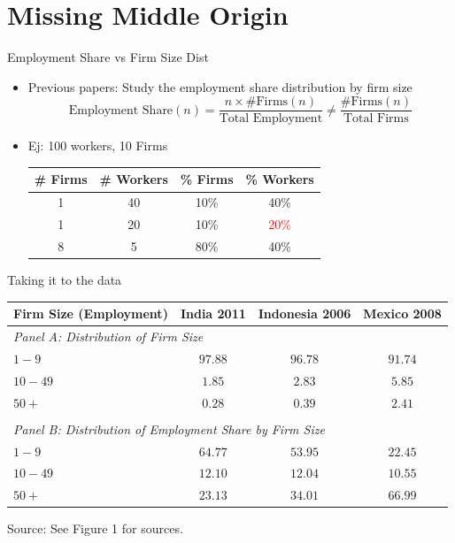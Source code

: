 \documentclass[usenames,dvipsnames,aspectratio=169]{beamer}
\begin{document}
\section{Missing Middle Origin}

\begin{frame}{Employment Share vs Firm Size Dist}
\begin{itemize}[label=\textcolor{violet}{$\blacktriangleright$}]
    \item Previous papers: Study the employment share distribution by firm size
    \begin{equation*}
        \text{Employment Share}(n) = \dfrac{n\times\#\text{Firms}(n)}{\text{Total Employment}}\neq  \dfrac{\#\text{Firms}(n)}{\text{Total Firms}}
    \end{equation*}
    \vfill
    \pause
    \item Ej: 100 workers, 10 Firms
    \begin{center}
    \small{
        \begin{tabular}{cccc} \hline\hline
            \# Firms & \# Workers & \% Firms & \% Workers \\ \hline
                1 &  40 & 10\% & 40\% \\ 
                1 &  20 & 10\% & \textcolor{red}{20\%} \\ 
                8 &  5  & 80\% & 40\% \\ 
                \hline\hline
        \end{tabular}
        }
    \end{center}
\end{itemize}
\end{frame}

\begin{frame}{Taking it to the data}
\begin{table}[h]
    \begin{center}
    \begin{tabular}{lccc}
    \hline \hline
    Firm Size (Employment) & India 2011 & Indonesia 2006 & Mexico 2008 \\
    \hline 
    \multicolumn{4}{l}{\textit{Panel A: Distribution of Firm Size}} \\
    $1-9$ & $97.88$ & $96.78$ & $91.74$ \\
    $10-49$ & $1.85$ & $2.83$ & $5.85$ \\
    $50+$ & $0.28$ & $0.39$ & $2.41$ \\
    & & & \\
    \multicolumn{4}{l}{\textit{Panel B: Distribution of Employment Share by Firm Size}} \\
    $1-9$ & $64.77$ & $53.95$ & $22.45$ \\
    $10-49$ & $12.10$ & $12.04$ & $10.55$ \\
    $50+$ & $23.13$ & $34.01$ & $66.99$ \\
    \hline\hline
    \end{tabular}
    \end{center}
    \footnotesize{Source: See Figure 1 for sources.}
    \end{table}
\end{frame}
\end{document}
